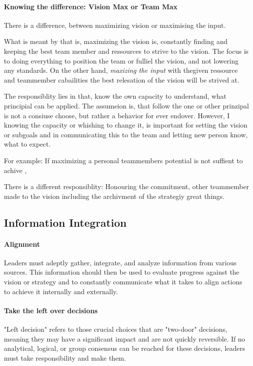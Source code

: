 \paragraph{Knowing the difference: Vision Max or Team Max}
There is a difference, between maximizing vision or maximising the input.

What is meant by that is, maximizing the vision is, constantly finding and keeping the best team member and ressources to strive to the vision. The focus is to doing everything to position the team or fulliel the vision, and not lowering any standards. On the other hand, \textit{maxizing the input} with thegiven ressource and teammember cabailities the best relesation of the vision will be strived at.

The responsiblity lies in that, know the own capacity to understand, what principial can be applied. The assumeion is, that follow the one or other prinzipal is not a consiuse choose, but rather a behavior for ever endover. However, I knowing the capacity or whishing to change it, is important for setting the vision or subgoals and in communicating this to the team and letting new person know, what to expect.

For example: If maximizing a personal teammembers potential is not suffient to achive ,


There is a different responsiblity: Honouring the commitment, other teammember made to the vision including the archivment of the strategiy great things.




\subsection{Information Integration}
\paragraph{Alignment}
Leaders must adeptly gather, integrate, and analyze information from various sources. This information should then be used to evaluate progress against the vision or strategy and to constantly communicate what it takes to align actions to achieve it internally and externally.

\paragraph{Take the left over decisions}
"Left decision" refers to those crucial choices that are "two-door" decisions, meaning they may have a significant impact and are not quickly reversible. If no analytical, logical, or group consensus can be reached for these decisions, leaders must take responsibility and make them.

